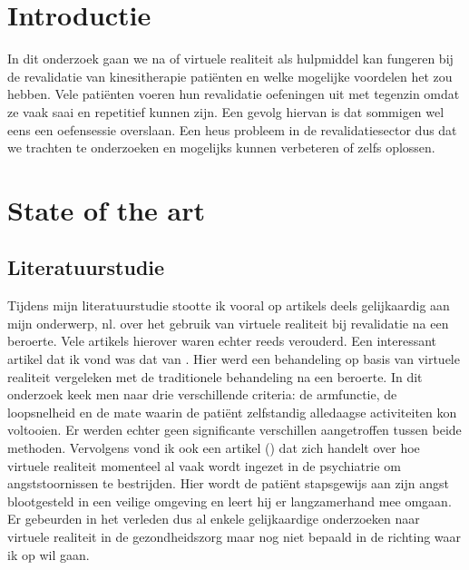 
\section{Introductie} %
\label{sec:introductie}

In dit onderzoek gaan we na of virtuele realiteit als hulpmiddel kan fungeren bij de revalidatie van kinesitherapie patiënten en welke mogelijke voordelen het zou hebben. Vele patiënten voeren hun revalidatie oefeningen uit met tegenzin omdat ze vaak saai en repetitief kunnen zijn. Een gevolg hiervan is dat sommigen wel eens een oefensessie overslaan. Een heus probleem in de revalidatiesector dus dat we trachten te onderzoeken en mogelijks kunnen verbeteren of zelfs oplossen.



\section{State of the art}
\label{sec:start-of-the-art}

\subsection{Literatuurstudie}
Tijdens mijn literatuurstudie stootte ik vooral op artikels deels gelijkaardig aan mijn onderwerp, nl. over het gebruik van virtuele realiteit bij revalidatie na een beroerte. Vele artikels hierover waren echter reeds verouderd. Een interessant artikel dat ik vond was dat van \textcite{Laver2017}. Hier werd een behandeling op basis van virtuele realiteit vergeleken met de traditionele behandeling na een beroerte. In dit onderzoek keek men naar drie verschillende criteria: de armfunctie, de loopsnelheid en de mate waarin de patiënt zelfstandig alledaagse activiteiten kon voltooien. Er werden echter geen significante verschillen aangetroffen tussen beide methoden. Vervolgens vond ik ook een artikel (\textcite{Reddy2018}) dat zich handelt over hoe virtuele realiteit momenteel al vaak wordt ingezet in de psychiatrie om angststoornissen te bestrijden. Hier wordt de patiënt stapsgewijs aan zijn angst blootgesteld in een veilige omgeving en leert hij er langzamerhand mee omgaan. Er gebeurden in het verleden dus al enkele gelijkaardige onderzoeken naar virtuele realiteit in de gezondheidszorg maar nog niet bepaald in de richting waar ik op wil gaan.


